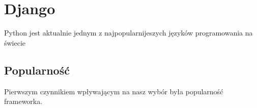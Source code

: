\chapter{Django}

Python jest aktualnie jednym z najpopularnijeszych języków programowania na świecie

\section{Popularność}
Pierwszym czynnikiem wpływającym na nasz wybór była popularność frameworka. 